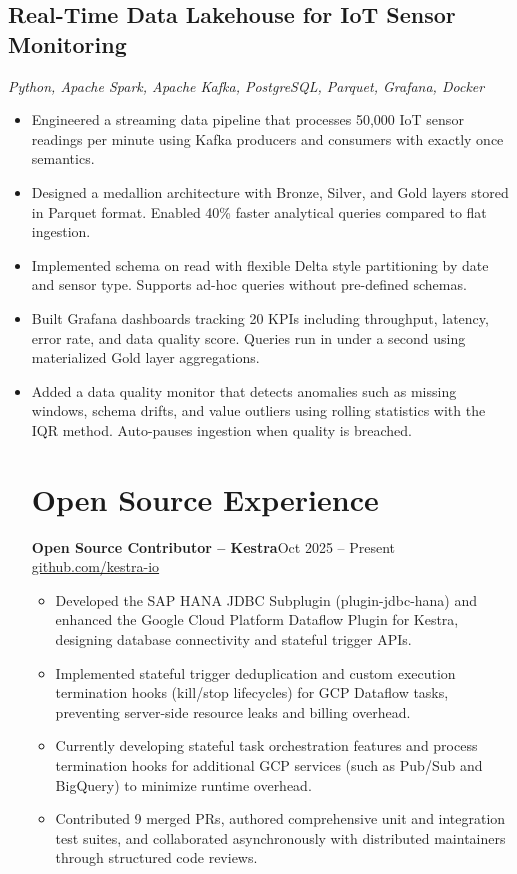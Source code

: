 \documentclass[10pt]{article}
\begin{document}
\subsection{Real-Time Data Lakehouse for IoT Sensor Monitoring}
\textit{Python, Apache Spark, Apache Kafka, PostgreSQL, Parquet, Grafana, Docker}
\begin{itemize}
  \item Engineered a streaming data pipeline that processes 50,000 IoT sensor readings per minute using Kafka producers and consumers with exactly once semantics.
  \item Designed a medallion architecture with Bronze, Silver, and Gold layers stored in Parquet format. Enabled 40\% faster analytical queries compared to flat ingestion.
  \item Implemented schema on read with flexible Delta style partitioning by date and sensor type. Supports ad-hoc queries without pre-defined schemas.
  \item Built Grafana dashboards tracking 20 KPIs including throughput, latency, error rate, and data quality score. Queries run in under a second using materialized Gold layer aggregations.
  \item Added a data quality monitor that detects anomalies such as missing windows, schema drifts, and value outliers using rolling statistics with the IQR method. Auto-pauses ingestion when quality is breached.

\section{Open Source Experience}
\textbf{Open Source Contributor -- Kestra}\hfill Oct 2025 -- Present\\
\href{https://github.com/kestra-io}{github.com/kestra-io}
\begin{itemize}
  \item Developed the SAP HANA JDBC Subplugin (plugin-jdbc-hana) and enhanced the Google Cloud Platform Dataflow Plugin for Kestra, designing database connectivity and stateful trigger APIs.
  \item Implemented stateful trigger deduplication and custom execution termination hooks (kill/stop lifecycles) for GCP Dataflow tasks, preventing server-side resource leaks and billing overhead.
  \item Currently developing stateful task orchestration features and process termination hooks for additional GCP services (such as Pub/Sub and BigQuery) to minimize runtime overhead.
  \item Contributed 9 merged PRs, authored comprehensive unit and integration test suites, and collaborated asynchronously with distributed maintainers through structured code reviews.
\end{itemize}


\end{itemize}
\end{document}
